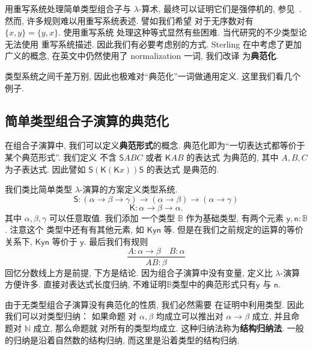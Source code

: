 \documentclass[UTF8]{ctexbook}
\newcommand{\cons}[1]{\textsf{#1}}
\theoremstyle{plain}
\theoremstyle{definition}
\theoremstyle{remark}
\begin{document}
用重写系统处理简单类型组合子与 \(\lambda\)-算术,
最终可以证明它们是强停机的, 参见~\cite{loader:1998:stlc}.
然而, 许多规则难以用重写系统表述. 譬如我们希望
对于无序数对有 \(\{x,y\} = \{y,x\}\). 使用重写系统
处理这种等式显然有些困难. 当代研究的不少类型论无法使用
重写系统描述. 因此我们有必要考虑别的方式. Sterling
在\cite{sterling:2021:thesis}中考虑了更加广义的概念,
在英文中仍然使用了 normalization 一词, 我们改译
为\textbf{典范化}.

类型系统之间千差万别, 因此也极难对“典范化”一词做通用定义.
这里我们看几个例子.

\subsection{简单类型组合子演算的典范化}
在组合子演算中, 我们可以定义\textbf{典范形式}的概念.
典范化即为“一切表达式都等价于某个典范形式”. 我们定义
不含 \(\cons{S}ABC\) 或者 \(\cons{K}AB\) 的表达式
为典范的, 其中 \(A,B,C\) 为子表达式. 因此譬如
\(\cons{S}(\cons{K}(\cons{K}x))\cons{S}\) 的表达式
是典范的.

我们类比简单类型 \(\lambda\)-演算的方案定义类型系统.
\[\cons{S} : (\alpha \to \beta \to \gamma)
\to (\alpha \to \beta) \to (\alpha \to \gamma)\]
\[\cons{K} : \alpha \to \beta \to \alpha.\]
其中 \(\alpha,\beta,\gamma\) 可以任意取值. 我们添加
一个类型 \(\mathbb B\) 作为基础类型, 有两个元素
\(\cons{y}, \cons{n} : \mathbb B\). 注意这个
类型中还有有其他元素, 如 \(\cons{K}\cons{y}\cons{n}\) 等.
但是在我们之前规定的运算的等价关系下, \(\cons{K}\cons{y}\cons{n}\) 等价于 \(\cons{y}\).
最后我们有规则
\[\frac{A : \alpha \to \beta \quad B : \alpha}{AB : \beta}\]
回忆分数线上方是前提, 下方是结论. 因为组合子演算中没有变量,
定义比 \(\lambda\)-演算方便许多. 直接对表达式长度归纳,
不难证明\(\mathbb B\)类型中的典范形式只有\(\cons{y}\)
与 \(\cons{n}\).

由于无类型组合子演算没有典范化的性质, 我们必然需要
在证明中利用类型. 因此我们可以对类型归纳： 如果命题
对 \(\alpha,\beta\) 均成立可以推出对 \(\alpha\to\beta\)
成立, 并且命题对 \(\mathbb N\) 成立, 那么命题就
对所有的类型均成立. 这种归纳法称为\textbf{结构归纳法}.
一般的归纳是沿着自然数的结构归纳, 而这里是沿着类型的结构归纳.
\end{document}
